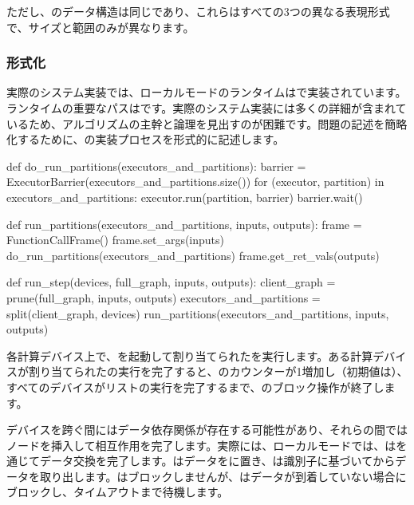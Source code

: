 \begin{content}
ただし、のデータ構造は同じであり、これらはすべての3つの異なる表現形式で、サイズと範囲のみが異なります。

\subsubsection{形式化}

実際のシステム実装では、ローカルモードのランタイムはで実装されています。\tf{}ランタイムの重要なパスはです。実際のシステム実装には多くの詳細が含まれているため、アルゴリズムの主幹と論理を見出すのが困難です。問題の記述を簡略化するために、の実装プロセスを形式的に記述します。

\begin{leftbar}
\begin{python}
def do_run_partitions(executors_and_partitions):
  barrier = ExecutorBarrier(executors_and_partitions.size())
  for (executor, partition) in executors_and_partitions:
    executor.run(partition, barrier)  
  barrier.wait()

def run_partitions(executors_and_partitions, inputs, outputs):
  frame = FunctionCallFrame()
  frame.set_args(inputs)
  do_run_partitions(executors_and_partitions)
  frame.get_ret_vals(outputs)

def run_step(devices, full_graph, inputs, outputs):
  client_graph = prune(full_graph, inputs, outputs)
  executors_and_partitions = split(client_graph, devices)
  run_partitions(executors_and_partitions, inputs, outputs)
\end{python}
\end{leftbar}

各計算デバイス上で、を起動して割り当てられたを実行します。ある計算デバイスが割り当てられたの実行を完了すると、のカウンターが1増加し（初期値は）、すべてのデバイスがリストの実行を完了するまで、のブロック操作が終了します。

デバイスを跨ぐ間にはデータ依存関係が存在する可能性があり、それらの間ではノードを挿入して相互作用を完了します。実際には、ローカルモードでは、はを通じてデータ交換を完了します。はデータをに置き、は識別子に基づいてからデータを取り出します。はブロックしませんが、はデータが到着していない場合にブロックし、タイムアウトまで待機します。


\end{content}
